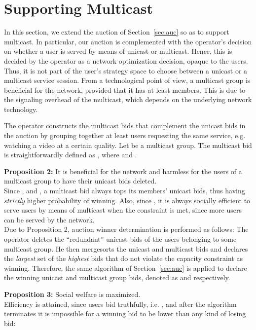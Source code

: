 \documentclass[a4paper]{article}
\begin{document}
\section{Supporting Multicast}\label{sec:mc}

In this section, we extend the auction of Section~\ref{sec:auc} so as
to support multicast. In particular, our auction is complemented
with the operator's decision on whether a user is served by means of  
unicast or multicast. Hence, this is decided by the operator 
as a network optimization decision, opaque to the users.
Thus, it is not part of the
user's strategy space to choose between a unicast or a multicast service session.
From a technological point of view, a
multicast group is beneficial for the network, provided that it has 
at least  members. This is due to the signaling overhead of the 
multicast, which depends on the underlying network technology. 

The operator constructs the multicast bids  that
complement the unicast bids  in the auction
by grouping together at least  users requesting the same 
service, e.g. watching a video at a certain quality. Let  be a 
multicast group. 
The multicast bid is straightforwardly defined as ,  
where  and . 


{\bf Proposition 2:} It is beneficial for the network and harmless for the 
users of a multicast group to have their unicast bids deleted.
\\
Since , and ,
a multicast bid always tops its members' unicast bids, thus having 
{\em strictly} higher probability of winning.
Also, since ,
it is always socially efficient to serve users by means of multicast when
the  constraint is met,
since more users can be served by the network.
\\

Due to Proposition 2, auction winner determination is performed as follows:
The operator deletes the ``redundant'' unicast bids of the users belonging
to some multicast group. He then mergesorts the unicast and multicast bids and 
declares the {\em largest} set of the {\em highest} bids  
that do not violate the capacity constraint as winning. Therefore, the
same algorithm of Section~\ref{sec:auc} is applied to declare the winning
unicast and multicast group bids, denoted as  and 
 respectively. 


{\bf Proposition 3:} Social welfare is maximized.
\\
Efficiency is attained, since users bid truthfully, 
i.e. , and after the algorithm terminates it is impossible for
a winning bid to be lower than any kind of losing bid:
\end{document}
